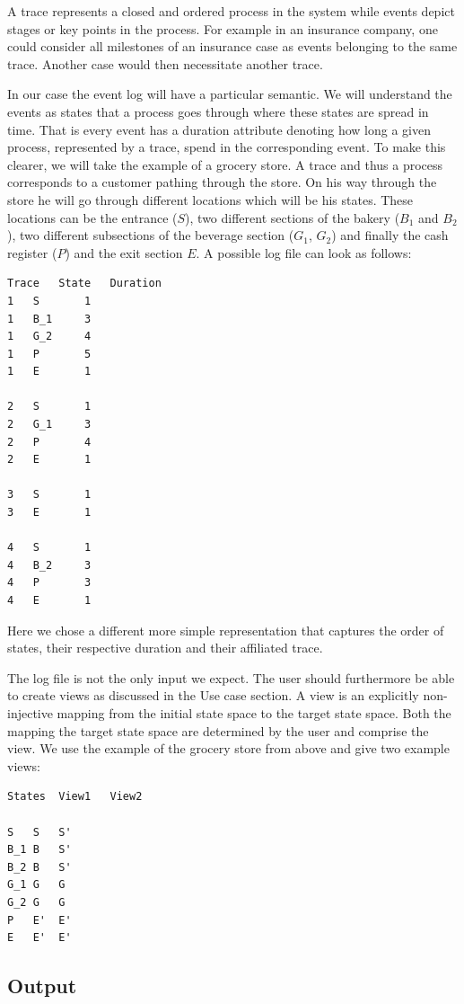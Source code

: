 \documentclass[12pt]{extarticle}
\begin{document}
A trace represents a closed and ordered process in the system while events depict stages or key points in the process. For example in an insurance company, one could consider all milestones of an insurance case as events belonging to the same trace. Another case would then necessitate another trace.

In our case the event log will have a particular semantic. We will understand the events as states that a process goes through where these states are spread in time. That is every event has a duration attribute denoting how long a given process, represented by a trace, spend in the corresponding event. To make this clearer, we will take the example of a grocery store. A trace and thus a process corresponds to a customer pathing through the store. On his way through the store he will go through different locations which will be his states. These locations can be the entrance ($S$), two different sections of the bakery ($B_1$ and $B_2$), two different subsections of the beverage section ($G_1$, $G_2$) and finally the cash register ($P$) and the exit section $E$. A possible log file can look as follows:

\begin{lstlisting}
Trace	State   Duration
1 	S   	1
1 	B_1 	3
1 	G_2 	4
1 	P   	5
1 	E   	1

2 	S   	1
2 	G_1 	3
2 	P   	4
2 	E   	1

3 	S   	1
3 	E   	1

4 	S   	1
4 	B_2 	3
4 	P   	3
4 	E   	1
\end{lstlisting}

Here we chose a different more simple representation that captures the order of states, their respective duration and their affiliated trace.

The log file is not the only input we expect. The user should furthermore be able to create views as discussed in the Use case section. A view is an explicitly non-injective mapping from the initial state space to the target state space. Both the mapping the target state space are determined by the user and comprise the view. We use the example of the grocery store from above and give two example views:

\begin{lstlisting}
States 	View1	View2

S	S	S'
B_1	B	S'
B_2	B	S'
G_1	G	G
G_2	G	G
P	E'	E'
E	E'	E'
\end{lstlisting}

\subsection{Output}
\end{document}
